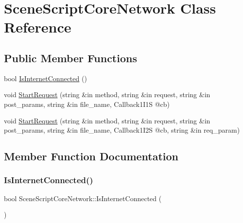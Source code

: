 \hypertarget{class_scene_script_core_network}{}\section{Scene\+Script\+Core\+Network Class Reference}
\label{class_scene_script_core_network}
\subsection*{Public Member Functions}
\begin{DoxyCompactItemize}
\item 
bool \hyperlink{class_scene_script_core_network_ac500b0ff0901d420263d9389ab63feff}{Is\+Internet\+Connected} ()
\item 
void \hyperlink{class_scene_script_core_network_a43de000cad635aafa251f6a25fa5f924}{Start\+Request} (string \&in method, string \&in request, string \&in post\+\_\+params, string \&in file\+\_\+name, Callback1\+I1S @cb)
\item 
void \hyperlink{class_scene_script_core_network_aa6fdc692a9be491752fd6c6ed6773ede}{Start\+Request} (string \&in method, string \&in request, string \&in post\+\_\+params, string \&in file\+\_\+name, Callback1\+I2S @cb, string \&in req\+\_\+param)
\end{DoxyCompactItemize}


\subsection{Member Function Documentation}
\hypertarget{class_scene_script_core_network_ac500b0ff0901d420263d9389ab63feff}{}\label{class_scene_script_core_network_ac500b0ff0901d420263d9389ab63feff} 
\subsubsection{\texorpdfstring{Is\+Internet\+Connected()}{IsInternetConnected()}}
{\footnotesize\ttfamily bool Scene\+Script\+Core\+Network\+::\+Is\+Internet\+Connected (\begin{DoxyParamCaption}{ }\end{DoxyParamCaption})}

\hypertarget{class_scene_script_core_network_a43de000cad635aafa251f6a25fa5f924}{}\label{class_scene_script_core_network_a43de000cad635aafa251f6a25fa5f924} 
